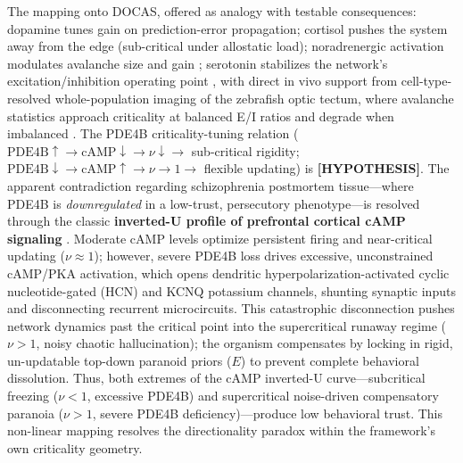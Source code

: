 \documentclass[
]{article}
\begin{document}
The mapping onto DOCAS, offered as analogy with testable consequences:
dopamine tunes gain on prediction-error propagation; cortisol pushes the
system away from the edge (sub-critical under allostatic load);
noradrenergic activation modulates avalanche size and gain ; serotonin
stabilizes the network's excitation/inhibition operating point , with
direct in vivo support from cell-type-resolved whole-population imaging
of the zebrafish optic tectum, where avalanche statistics approach
criticality at balanced E/I ratios and degrade when imbalanced . The
PDE4B criticality-tuning relation
(\(\mathrm{PDE4B}\uparrow \to \mathrm{cAMP}\downarrow \to \nu\downarrow \to\)
sub-critical rigidity;
\(\mathrm{PDE4B}\downarrow \to \mathrm{cAMP}\uparrow \to \nu \to 1 \to\)
flexible updating) is \textbf{{[}HYPOTHESIS{]}}. The apparent
contradiction regarding schizophrenia postmortem tissue---where PDE4B is
\emph{downregulated} in a low-trust, persecutory phenotype---is resolved
through the classic \textbf{inverted-U profile of prefrontal cortical
cAMP signaling} . Moderate cAMP levels optimize persistent firing and
near-critical updating (\(\nu \approx 1\)); however, severe PDE4B loss
drives excessive, unconstrained cAMP/PKA activation, which opens
dendritic hyperpolarization-activated cyclic nucleotide-gated (HCN) and
KCNQ potassium channels, shunting synaptic inputs and disconnecting
recurrent microcircuits. This catastrophic disconnection pushes network
dynamics past the critical point into the supercritical runaway regime
(\(\nu > 1\), noisy chaotic hallucination); the organism compensates by
locking in rigid, un-updatable top-down paranoid priors (\(E\)) to
prevent complete behavioral dissolution. Thus, both extremes of the cAMP
inverted-U curve---subcritical freezing (\(\nu < 1\), excessive PDE4B)
and supercritical noise-driven compensatory paranoia (\(\nu > 1\),
severe PDE4B deficiency)---produce low behavioral trust. This non-linear
mapping resolves the directionality paradox within the framework's own
criticality geometry.
\end{document}
